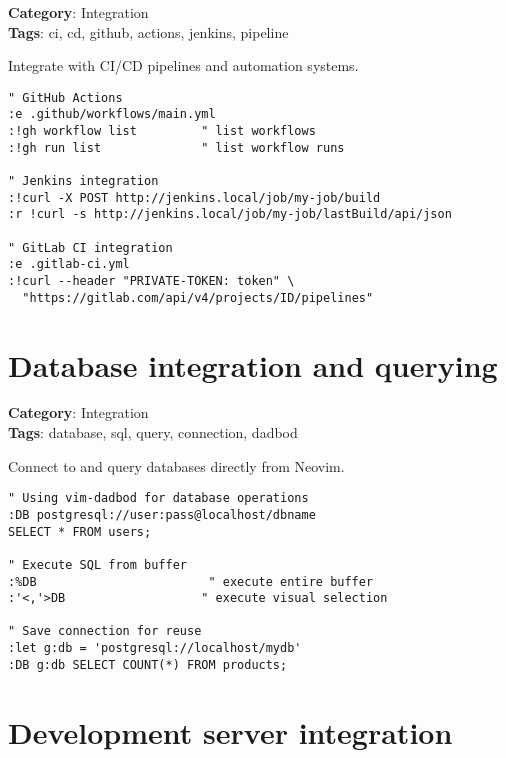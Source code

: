{{{{{\textbf{Category}: Integration\\ \textbf{Tags}: ci, cd, github, actions, jenkins, pipeline
\vspace{0.5cm}

Integrate with CI/CD pipelines and automation systems.

\begin{Exa*}{}
\begin{Verbatim}[fontsize=\footnotesize, breaklines, breakanywhere]
" GitHub Actions
:e .github/workflows/main.yml
:!gh workflow list         " list workflows
:!gh run list              " list workflow runs

" Jenkins integration
:!curl -X POST http://jenkins.local/job/my-job/build
:r !curl -s http://jenkins.local/job/my-job/lastBuild/api/json

" GitLab CI integration
:e .gitlab-ci.yml
:!curl --header "PRIVATE-TOKEN: token" \
  "https://gitlab.com/api/v4/projects/ID/pipelines"
\end{Verbatim}
\end{Exa*}

\section{Database integration and querying}

\textbf{Category}: Integration\\ \textbf{Tags}: database, sql, query, connection, dadbod
\vspace{0.5cm}

Connect to and query databases directly from Neovim.

\begin{Exa*}{}
\begin{Verbatim}[fontsize=\footnotesize, breaklines, breakanywhere]
" Using vim-dadbod for database operations
:DB postgresql://user:pass@localhost/dbname
SELECT * FROM users;

" Execute SQL from buffer
:%DB                        " execute entire buffer
:'<,'>DB                   " execute visual selection

" Save connection for reuse
:let g:db = 'postgresql://localhost/mydb'
:DB g:db SELECT COUNT(*) FROM products;
\end{Verbatim}
\end{Exa*}

\section{Development server integration}

}}}}}
